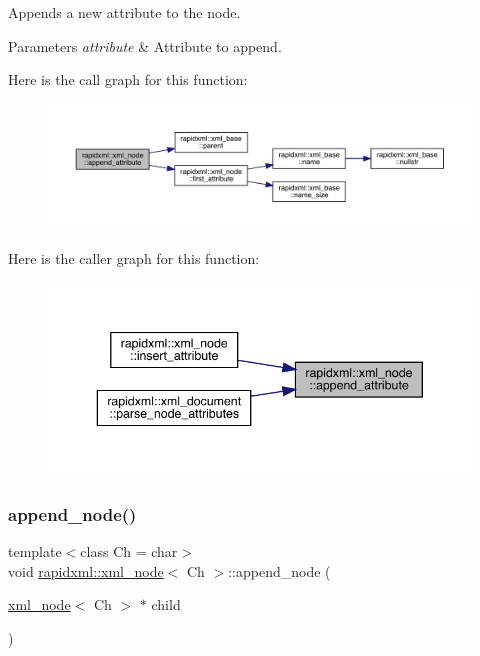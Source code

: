Appends a new attribute to the node. 
\begin{DoxyParams}{Parameters}
{\em attribute} & Attribute to append. \\
\hline
\end{DoxyParams}
Here is the call graph for this function\+:\nopagebreak
\begin{figure}[H]
\begin{center}
\leavevmode
\includegraphics[width=350pt]{classrapidxml_1_1xml__node_a33ce3386f8c42dd4db658b75cbb6e6c4_cgraph}
\end{center}
\end{figure}
Here is the caller graph for this function\+:\nopagebreak
\begin{figure}[H]
\begin{center}
\leavevmode
\includegraphics[width=343pt]{classrapidxml_1_1xml__node_a33ce3386f8c42dd4db658b75cbb6e6c4_icgraph}
\end{center}
\end{figure}
\mbox{\label{classrapidxml_1_1xml__node_a8696d098ecc9c4d2a646b43e91d58e31}} 
\subsubsection{\texorpdfstring{append\_node()}{append\_node()}}
{\footnotesize\ttfamily template$<$class Ch = char$>$ \\
void \mbox{\hyperlink{classrapidxml_1_1xml__node}{rapidxml\+::xml\+\_\+node}}$<$ Ch $>$\+::append\+\_\+node (\begin{DoxyParamCaption}\item[{\mbox{\hyperlink{classrapidxml_1_1xml__node}{xml\+\_\+node}}$<$ Ch $>$ $\ast$}]{child }\end{DoxyParamCaption})\hspace{0.3cm}{\ttfamily [inline]}}

